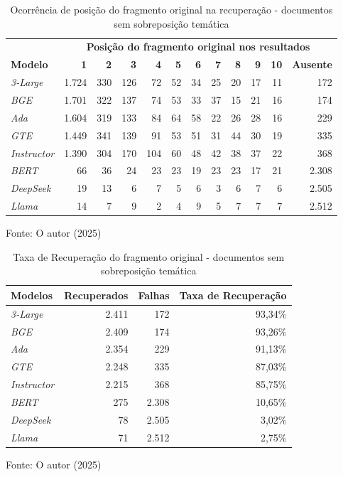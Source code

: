\begin{table}[H]
    \caption{Ocorrência de posição do fragmento original na recuperação - documentos sem sobreposição temática}
    \centering
    \begin{tabular}{ l r r r r r r r r r r r }
        \hline
            & \multicolumn{11}{c}{\textbf{Posição do fragmento original nos resultados}} \\
        \textbf{Modelo} & \textbf{1} & \textbf{2} & \textbf{3} & \textbf{4} & \textbf{5} & \textbf{6} & \textbf{7} & \textbf{8} & \textbf{9} & \textbf{10} & \textbf{Ausente} \\  
        \hline
        \textit{3-Large} & 1.724 & 330 & 126 & 72 & 52 & 34 & 25 & 20 & 17 & 11 & 172 \\
        \textit{BGE} & 1.701 & 322 & 137 & 74 & 53 & 33 & 37 & 15 & 21 & 16 & 174 \\
        \textit{Ada} & 1.604 & 319 & 133 & 84 & 64 & 58 & 22 & 26 & 28 & 16 & 229 \\
        \textit{GTE} & 1.449 & 341 & 139 & 91 & 53 & 51 & 31 & 44 & 30 & 19 & 335 \\
        \textit{Instructor} & 1.390 & 304 & 170 & 104 & 60 & 48 & 42 & 38 & 37 & 22 & 368 \\
        \textit{BERT} & 66 & 36 & 24 & 23 & 23 & 19 & 23 & 23 & 17 & 21 & 2.308 \\
        \textit{DeepSeek} & 19 & 13 & 6 & 7 & 5 & 6 & 3 & 6 & 7 & 6 & 2.505 \\
        \textit{Llama} & 14 & 7 & 9 & 2 & 4 & 9 & 5 & 7 & 7 & 7 & 2.512 \\
        \hline
    \end{tabular}
    
    Fonte: O autor (2025)
    \label{tab:recuperacao-rank}
\end{table}

\begin{table}[H]
    \caption{Taxa de Recuperação do fragmento original - documentos sem sobreposição temática}
    \centering
    \begin{tabular}{ l r r r }
        \hline
        \textbf{Modelos} & \textbf{Recuperados} & \textbf{Falhas} & \textbf{Taxa de Recuperação} \\
        \hline
        \textit{3-Large} & 2.411 & 172 & 93,34\% \\
        \textit{BGE} & 2.409 & 174 & 93,26\% \\
        \textit{Ada} & 2.354 & 229 & 91,13\% \\
        \textit{GTE} & 2.248 & 335 & 87,03\% \\
        \textit{Instructor} & 2.215 & 368 & 85,75\% \\
        \textit{BERT} & 275 & 2.308 & 10,65\% \\
        \textit{DeepSeek} & 78 & 2.505 & 3,02\% \\
        \textit{Llama} & 71 & 2.512 & 2,75\% \\
        \hline
    \end{tabular}
    
    Fonte: O autor (2025)
    \label{tab:recuperacao-top}
\end{table}

